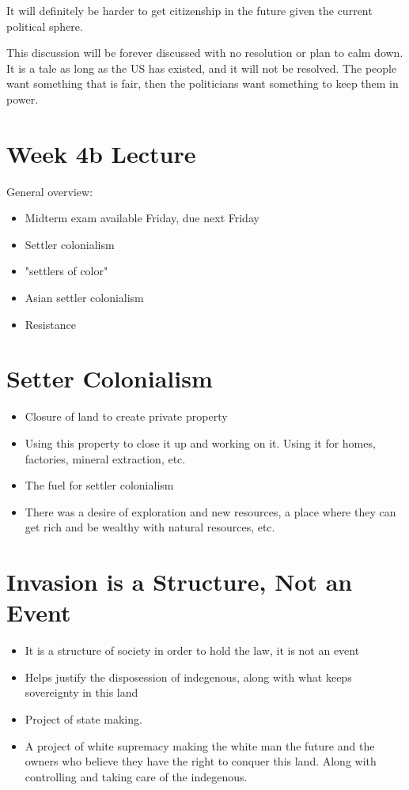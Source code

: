 \documentclass{article}
\begin{document}
It will definitely be harder to get citizenship in the future given the current political
sphere.

This discussion will be forever discussed with no resolution or plan to calm down.
It is a tale as long as the US has existed, and it will not be resolved.
The people want something that is fair, then the politicians want something
to keep them in power.

\pagebreak

\section*{Week 4b Lecture}
General overview:
\begin{itemize}
  \item Midterm exam available Friday, due next Friday
  \item Settler colonialism
  \item "settlers of color"
  \item Asian settler colonialism
  \item Resistance
\end{itemize}

\section{Setter Colonialism}
\begin{itemize}
  \item Closure of land to create private property
  \item Using this property to close it up and working on it.
    Using it for homes, factories, mineral extraction, etc.
    \item The fuel for settler colonialism
    \item There was a desire of exploration and new resources,
      a place where they can get rich and be wealthy with natural resources, etc.
\end{itemize}

\section*{Invasion is a Structure, Not an Event}
\begin{itemize}
  \item It is a structure of society in order to hold the law, it is not an event
  \item Helps justify the disposession of indegenous, along with what keeps sovereignty in this land
  \item Project of state making.
  \item A project of white supremacy making the white man the future and 
    the owners who believe they have the right to conquer this land. Along with
    controlling and taking care of the indegenous.
\end{itemize}
\end{document}
